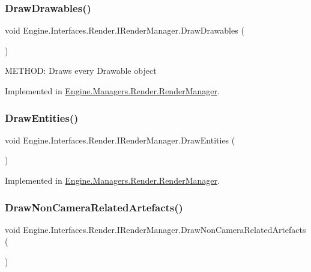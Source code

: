 \subsubsection{\texorpdfstring{Draw\+Drawables()}{DrawDrawables()}}
{\footnotesize\ttfamily void Engine.\+Interfaces.\+Render.\+I\+Render\+Manager.\+Draw\+Drawables (\begin{DoxyParamCaption}{ }\end{DoxyParamCaption})}



M\+E\+T\+H\+OD\+: Draws every Drawable object 



Implemented in \hyperlink{a00526_aa957794d6537025fb2535517bcc691cc}{Engine.\+Managers.\+Render.\+Render\+Manager}.

\mbox{\label{a00458_aa7c35d67893f29738baab63370d16b10}} 
\subsubsection{\texorpdfstring{Draw\+Entities()}{DrawEntities()}}
{\footnotesize\ttfamily void Engine.\+Interfaces.\+Render.\+I\+Render\+Manager.\+Draw\+Entities (\begin{DoxyParamCaption}{ }\end{DoxyParamCaption})}



Implemented in \hyperlink{a00526_a9eb548f058744b031b639810a16ba40d}{Engine.\+Managers.\+Render.\+Render\+Manager}.

\mbox{\label{a00458_a566b23b9d0b60e2fb06107e7a6c239cb}} 
\subsubsection{\texorpdfstring{Draw\+Non\+Camera\+Related\+Artefacts()}{DrawNonCameraRelatedArtefacts()}}
{\footnotesize\ttfamily void Engine.\+Interfaces.\+Render.\+I\+Render\+Manager.\+Draw\+Non\+Camera\+Related\+Artefacts (\begin{DoxyParamCaption}{ }\end{DoxyParamCaption})}




